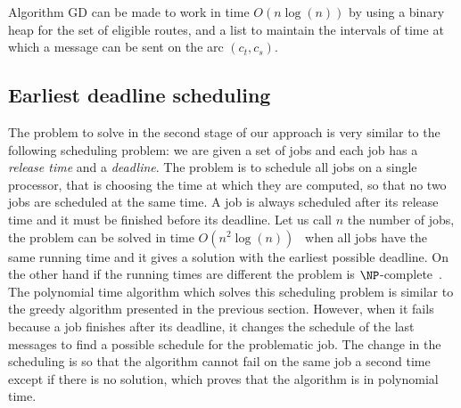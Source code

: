 \documentclass[10pt, conference, letterpaper]{IEEEtran}
\begin{document}
    Algorithm GD can be made to work in time $O(n\log(n))$ by using a binary heap for the set of eligible routes, and a list to maintain the intervals of time at which a message can be sent on the arc $(c_t,c_s)$.
%    
%     
    

    
     
     \subsection{Earliest deadline scheduling}
     
     
     The problem to solve in the second stage of our approach is very similar to the following scheduling problem: 
     we are given a set of jobs and each job has a \emph{release time} and a \emph{deadline}. 
     The problem is to schedule all jobs on a single processor, that is choosing the time at which they are computed, so that no two jobs are scheduled at the same time. A job is always scheduled after its release time and it must be finished before its deadline. Let us call $n$ the number of jobs, the problem can be solved in time $O(n^2\log(n))$~\cite{simons1978fast} when all jobs have the same running time and it gives a solution with the earliest possible deadline. On the other hand if the running times are different the problem is $\NP$-complete~\cite{lenstra1977complexity}. 
     The  polynomial time algorithm  which solves this scheduling problem is similar to the greedy algorithm presented in the previous section. However, when it fails because a job finishes after its deadline, it changes the schedule of the last messages to find a possible schedule for the problematic job. The change in the scheduling is so that the algorithm cannot fail on the same job a second time except if there is no solution, which proves that the algorithm is in polynomial time.
     
\end{document}
